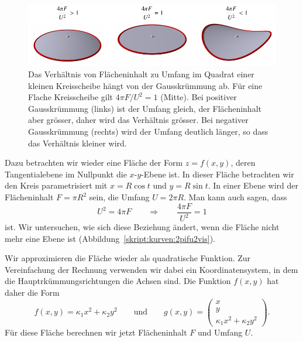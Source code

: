 \begin{figure}
\centering
\includegraphics{chapters/tikz/4pifu2.pdf}
\caption{Das Verhältnis von Flächeninhalt zu Umfang im Quadrat einer
kleinen Kreisscheibe hängt von der Gausskrümmung ab. 
Für eine Flache Kreisscheibe gilt $4\pi F/U^2=1$ (Mitte).
Bei positiver Gausskrümmung (links) ist der Umfang gleich, der Flächeninhalt
aber grösser, daher wird das Verhältnis grösser.
Bei negativer Gausskrümmung (rechts) wird der Umfang deutlich länger, so dass
das Verhältnis kleiner wird.
\label{skript:kurven:4pifu2vis}}
\end{figure}
Dazu betrachten wir wieder eine Fläche der Form $z=f(x,y)$, deren
Tangentialebene im Nullpunkt die $x$-$y$-Ebene ist.
In dieser Fläche betrachten wir den Kreis parametrisiert mit
$x=R\cos t$ und $y=R\sin t$.
In einer Ebene wird der Flächeninhalt $F=\pi R^2$ sein, die Umfang $U=2\pi R$.
Man kann auch sagen, dass
\[
U^2 = 4\pi F
\qquad\Rightarrow\qquad
\frac{4\pi F}{U^2}=1
\]
ist.
Wir untersuchen, wie sich diese Beziehung ändert, wenn die
Fläche nicht mehr eine Ebene ist (Abbildung~\ref{skript:kurven:2pifu2vis}).

Wir approximieren die Fläche wieder als quadratische Funktion.
Zur Vereinfachung der Rechnung verwenden wir dabei ein Koordinatensystem,
in dem die Hauptrkümmungsrichtungen die Achsen sind.
Die Funktion $f(x,y)$ hat daher die Form
\[
f(x,y)
=
\kappa_1 x^2 + \kappa_2 y^2
\qquad\text{und}\qquad
g(x,y)=\begin{pmatrix}x\\y\\\kappa_1x^2 + \kappa_2y^2\end{pmatrix}.
\]
Für diese Fläche berechnen wir jetzt Flächeninhalt $F$ und 
Umfang $U$.

